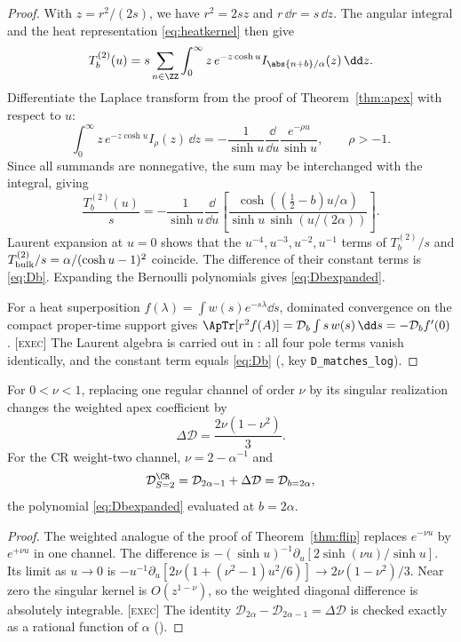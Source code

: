 \begin{proof}
With \(z=r^2/(2s)\), we have \(r^2=2sz\) and
\(r\,\dd r=s\,\dd z\).
The angular integral and the heat representation
\eqref{eq:heatkernel} then give
\[
T^{(2)}_b(u)=s\sum_{n\in\ZZ}\int_0^\infty
z\,e^{-z\cosh u}I_{\abs{n+b}/\alpha}(z)\,\dd z.
\]
Differentiate the Laplace transform from the proof of
Theorem~\ref{thm:apex} with respect to \(u\):
\[
\int_0^\infty z\,e^{-z\cosh u}I_\rho(z)\,\dd z
=-\frac1{\sinh u}\frac{\dd}{\dd u}
\frac{e^{-\rho u}}{\sinh u},
\qquad \rho>-1.
\]
Since all summands are nonnegative, the sum may be interchanged
with the integral, giving
\[
\frac{T^{(2)}_b(u)}{s}=-\frac1{\sinh u}\frac{\dd}{\dd u}
\left[\frac{\cosh((\tfrac12-b)u/\alpha)}
{\sinh u\,\sinh(u/(2\alpha))}\right].
\]
Laurent expansion at \(u=0\) shows that the
\(u^{-4},u^{-3},u^{-2},u^{-1}\) terms of
\(T^{(2)}_b/s\) and \(T^{(2)}_{\rm bulk}/s=\alpha/(\cosh u-1)^2\)
coincide.
The difference of their constant terms is \eqref{eq:Db}.
Expanding the Bernoulli polynomials gives \eqref{eq:Dbexpanded}.

For a heat superposition \(f(\lambda)=\int w(s)e^{-s\lambda}\dd s\),
dominated convergence on the compact proper-time support gives
\(\ApTr[r^2f(A)]=\mathcal D_b\int s\,w(s)\,\dd s
=-\mathcal D_bf'(0)\).
\textsc{[exec]} The Laurent algebra is carried out in
: all four pole terms vanish identically,
and the constant term equals \eqref{eq:Db}
(, key \texttt{D\_matches\_log}).
\end{proof}

\begin{proposition}
\label{prop:weightedflip}
For \(0<\nu<1\), replacing one regular channel of order \(\nu\) by
its singular realization changes the weighted apex coefficient by
\[
\Delta\mathcal D=\frac{2\nu(1-\nu^2)}{3}.
\]
For the CR weight-two channel, \(\nu=2-\alpha^{-1}\) and
\[
\mathcal D^\CR_{S=2}=\mathcal D_{2\alpha-1}+\Delta\mathcal D
=\mathcal D_{b=2\alpha},
\]
the polynomial \eqref{eq:Dbexpanded} evaluated at \(b=2\alpha\).
\end{proposition}

\begin{proof}
The weighted analogue of the proof of Theorem~\ref{thm:flip}
replaces \(e^{-\nu u}\) by \(e^{+\nu u}\) in one channel.
The difference is
\(-(\sinh u)^{-1}\partial_u[2\sinh(\nu u)/\sinh u]\).
Its limit as \(u\to0\) is
\(-u^{-1}\partial_u[2\nu(1+(\nu^2-1)u^2/6)]
\to2\nu(1-\nu^2)/3\).
Near zero the singular kernel is \(O(z^{1-\nu})\), so the weighted
diagonal difference is absolutely integrable.
\textsc{[exec]} The identity
\(\mathcal D_{2\alpha}-\mathcal D_{2\alpha-1}=\Delta\mathcal D\) is
checked exactly as a rational function of \(\alpha\)
().
\end{proof}

